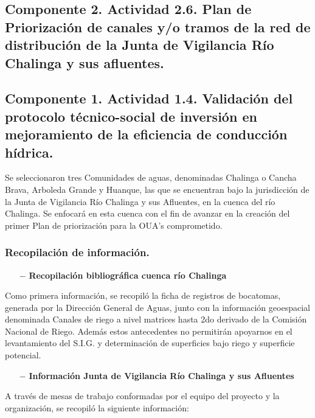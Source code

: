 \documentclass[]{article}
\begin{document}
\clearpage
\subsection{Componente 2. Actividad 2.6. Plan de Priorización de canales y/o tramos de la red de distribución de la Junta de Vigilancia Río Chalinga y sus afluentes.}


\subsection{Componente 1. Actividad 1.4. Validación del protocolo técnico-social de inversión en mejoramiento de la eficiencia de conducción hídrica.}

Se seleccionaron tres Comunidades de aguas, denominadas Chalinga o Cancha Brava, Arboleda Grande y Huanque, las que se encuentran bajo la jurisdicción de la Junta de Vigilancia Río Chalinga y sus Afluentes, en la cuenca del río Chalinga. Se enfocará en esta cuenca con el fin de avanzar en la creación del primer Plan de priorización para la OUA's comprometido.

\subsubsection{Recopilación de información.}

\begin{itemize}
	\item[$-$] \textbf{Recopilación bibliográfica cuenca río Chalinga}
\end{itemize}

Como primera información, se recopiló la ficha de registros de bocatomas, generada por la Dirección General de Aguas, junto con la información geoespacial denominada Canales de riego a nivel matrices hasta 2do derivado de la Comisión Nacional de Riego. Además estos antecedentes no permitirán apoyarnos en el levantamiento del S.I.G. y determinación de superficies bajo riego y superficie potencial.

\begin{itemize}
	\item[$-$] \textbf{Información Junta de Vigilancia Río Chalinga y sus Afluentes}
\end{itemize}

A través de mesas de trabajo conformadas por el equipo del proyecto y la organización, se recopiló la siguiente información:
\end{document}
